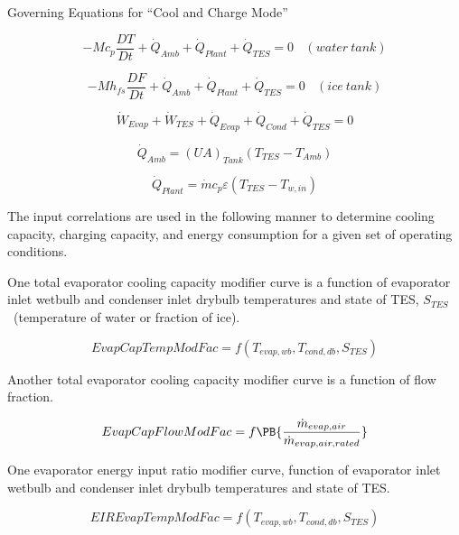 Governing Equations for ``Cool and Charge Mode''

\begin{equation}
-M{c_p}\frac{{DT}}{{Dt}} + {\dot Q_{Amb}} + {\dot Q_{Plant}} + {\dot Q_{TES}} = 0 ~~~~ (water~tank)
\end{equation}

\begin{equation}
-M{h_{fs}}\frac{{DF}}{{Dt}} + {\dot Q_{Amb}} + {\dot Q_{Plant}} + {\dot Q_{TES}} = 0 ~~~~ (ice~tank)
\end{equation}

\begin{equation}
{\dot W_{Evap}} + {\dot W_{TES}} + {\dot Q_{Evap}} + {\dot Q_{Cond}} + {\dot Q_{TES}} = 0
\end{equation}

\begin{equation}
{\dot Q_{Amb}} = {\left( {UA} \right)_{Tank}}\left( {{T_{TES}} - {T_{Amb}}} \right)
\end{equation}

\begin{equation}
  {\dot Q_{Plant}} = \dot m{c_p}\varepsilon \left( {{T_{TES}} - {T_{w,in}}} \right)
\end{equation}

The input correlations are used in the following manner to determine cooling capacity, charging capacity, and energy consumption for a given set of operating conditions.

One total evaporator cooling capacity modifier curve is a function of evaporator inlet wetbulb and condenser inlet drybulb temperatures and state of TES, \({S_{TES}}\) ~(temperature of water or fraction of ice).

\begin{equation}
EvapCapTempModFac = f\left( {{T_{evap,wb}},{T_{cond,db}},{S_{TES}}} \right)
\end{equation}

Another total evaporator cooling capacity modifier curve is a function of flow fraction.

\begin{equation}
EvapCapFlowModFac = f\PB{\frac{\dot{m}_{evap,air}}{\dot{m}_{evap,air,rated}}}
\end{equation}

One evaporator energy input ratio modifier curve, function of evaporator inlet wetbulb and condenser inlet drybulb temperatures and state of TES.

\begin{equation}
EIREvapTempModFac = f\left( {{T_{evap,wb}},{T_{cond,db}},{S_{TES}}} \right)
\end{equation}

